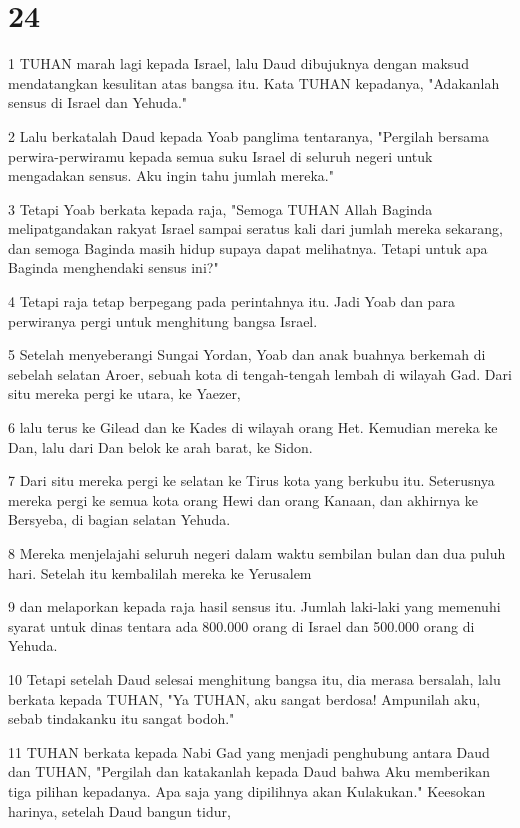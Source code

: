 \chapter{24}

\par 1 TUHAN marah lagi kepada Israel, lalu Daud dibujuknya dengan maksud mendatangkan kesulitan atas bangsa itu. Kata TUHAN kepadanya, "Adakanlah sensus di Israel dan Yehuda."
\par 2 Lalu berkatalah Daud kepada Yoab panglima tentaranya, "Pergilah bersama perwira-perwiramu kepada semua suku Israel di seluruh negeri untuk mengadakan sensus. Aku ingin tahu jumlah mereka."
\par 3 Tetapi Yoab berkata kepada raja, "Semoga TUHAN Allah Baginda melipatgandakan rakyat Israel sampai seratus kali dari jumlah mereka sekarang, dan semoga Baginda masih hidup supaya dapat melihatnya. Tetapi untuk apa Baginda menghendaki sensus ini?"
\par 4 Tetapi raja tetap berpegang pada perintahnya itu. Jadi Yoab dan para perwiranya pergi untuk menghitung bangsa Israel.
\par 5 Setelah menyeberangi Sungai Yordan, Yoab dan anak buahnya berkemah di sebelah selatan Aroer, sebuah kota di tengah-tengah lembah di wilayah Gad. Dari situ mereka pergi ke utara, ke Yaezer,
\par 6 lalu terus ke Gilead dan ke Kades di wilayah orang Het. Kemudian mereka ke Dan, lalu dari Dan belok ke arah barat, ke Sidon.
\par 7 Dari situ mereka pergi ke selatan ke Tirus kota yang berkubu itu. Seterusnya mereka pergi ke semua kota orang Hewi dan orang Kanaan, dan akhirnya ke Bersyeba, di bagian selatan Yehuda.
\par 8 Mereka menjelajahi seluruh negeri dalam waktu sembilan bulan dan dua puluh hari. Setelah itu kembalilah mereka ke Yerusalem
\par 9 dan melaporkan kepada raja hasil sensus itu. Jumlah laki-laki yang memenuhi syarat untuk dinas tentara ada 800.000 orang di Israel dan 500.000 orang di Yehuda.
\par 10 Tetapi setelah Daud selesai menghitung bangsa itu, dia merasa bersalah, lalu berkata kepada TUHAN, "Ya TUHAN, aku sangat berdosa! Ampunilah aku, sebab tindakanku itu sangat bodoh."
\par 11 TUHAN berkata kepada Nabi Gad yang menjadi penghubung antara Daud dan TUHAN, "Pergilah dan katakanlah kepada Daud bahwa Aku memberikan tiga pilihan kepadanya. Apa saja yang dipilihnya akan Kulakukan." Keesokan harinya, setelah Daud bangun tidur,
